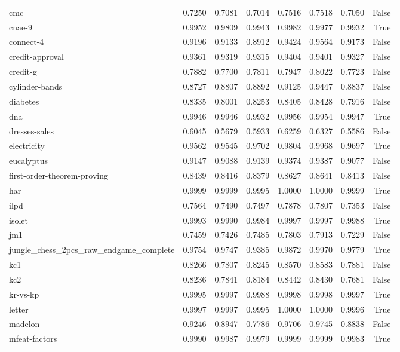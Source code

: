 \begin{table}[htbp]
\begin{tabular}{lrrrrrrr}
cmc & 0.7250 & 0.7081 & 0.7014 & 0.7516 & 0.7518 & 0.7050 & False \\
cnae-9 & 0.9952 & 0.9809 & 0.9943 & 0.9982 & 0.9977 & 0.9932 & True \\
connect-4 & 0.9196 & 0.9133 & 0.8912 & 0.9424 & 0.9564 & 0.9173 & False \\
credit-approval & 0.9361 & 0.9319 & 0.9315 & 0.9404 & 0.9401 & 0.9327 & False \\
credit-g & 0.7882 & 0.7700 & 0.7811 & 0.7947 & 0.8022 & 0.7723 & False \\
cylinder-bands & 0.8727 & 0.8807 & 0.8892 & 0.9125 & 0.9447 & 0.8837 & False \\
diabetes & 0.8335 & 0.8001 & 0.8253 & 0.8405 & 0.8428 & 0.7916 & False \\
dna & 0.9946 & 0.9946 & 0.9932 & 0.9956 & 0.9954 & 0.9947 & True \\
dresses-sales & 0.6045 & 0.5679 & 0.5933 & 0.6259 & 0.6327 & 0.5586 & False \\
electricity & 0.9562 & 0.9545 & 0.9702 & 0.9804 & 0.9968 & 0.9697 & True \\
eucalyptus & 0.9147 & 0.9088 & 0.9139 & 0.9374 & 0.9387 & 0.9077 & False \\
first-order-theorem-proving & 0.8439 & 0.8416 & 0.8379 & 0.8627 & 0.8641 & 0.8413 & False \\
har & 0.9999 & 0.9999 & 0.9995 & 1.0000 & 1.0000 & 0.9999 & True \\
ilpd & 0.7564 & 0.7490 & 0.7497 & 0.7878 & 0.7807 & 0.7353 & False \\
isolet & 0.9993 & 0.9990 & 0.9984 & 0.9997 & 0.9997 & 0.9988 & True \\
jm1 & 0.7459 & 0.7426 & 0.7485 & 0.7803 & 0.7913 & 0.7229 & False \\
jungle\_chess\_2pcs\_raw\_endgame\_complete & 0.9754 & 0.9747 & 0.9385 & 0.9872 & 0.9970 & 0.9779 & True \\
kc1 & 0.8266 & 0.7807 & 0.8245 & 0.8570 & 0.8583 & 0.7881 & False \\
kc2 & 0.8236 & 0.7841 & 0.8184 & 0.8442 & 0.8430 & 0.7681 & False \\
kr-vs-kp & 0.9995 & 0.9997 & 0.9988 & 0.9998 & 0.9998 & 0.9997 & True \\
letter & 0.9997 & 0.9997 & 0.9995 & 1.0000 & 1.0000 & 0.9996 & True \\
madelon & 0.9246 & 0.8947 & 0.7786 & 0.9706 & 0.9745 & 0.8838 & False \\
mfeat-factors & 0.9990 & 0.9987 & 0.9979 & 0.9999 & 0.9999 & 0.9983 & True \\

\end{tabular}
\end{table}

